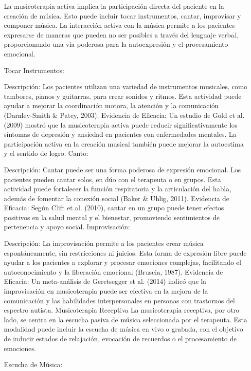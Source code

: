 La musicoterapia activa implica la participación directa del paciente en la creación de música. Esto puede incluir tocar instrumentos, cantar, improvisar y componer música. La interacción activa con la música permite a los pacientes expresarse de maneras que pueden no ser posibles a través del lenguaje verbal, proporcionando una vía poderosa para la autoexpresión y el procesamiento emocional.

Tocar Instrumentos:

Descripción: Los pacientes utilizan una variedad de instrumentos musicales, como tambores, pianos y guitarras, para crear sonidos y ritmos. Esta actividad puede ayudar a mejorar la coordinación motora, la atención y la comunicación (Darnley-Smith \& Patey, 2003).
Evidencia de Eficacia: Un estudio de Gold et al. (2009) mostró que la musicoterapia activa puede reducir significativamente los síntomas de depresión y ansiedad en pacientes con enfermedades mentales. La participación activa en la creación musical también puede mejorar la autoestima y el sentido de logro.
Canto:

Descripción: Cantar puede ser una forma poderosa de expresión emocional. Los pacientes pueden cantar solos, en dúo con el terapeuta o en grupos. Esta actividad puede fortalecer la función respiratoria y la articulación del habla, además de fomentar la conexión social (Baker \& Uhlig, 2011).
Evidencia de Eficacia: Según Clift et al. (2010), cantar en un grupo puede tener efectos positivos en la salud mental y el bienestar, promoviendo sentimientos de pertenencia y apoyo social.
Improvisación:

Descripción: La improvisación permite a los pacientes crear música espontáneamente, sin restricciones ni juicios. Esta forma de expresión libre puede ayudar a los pacientes a explorar y procesar emociones complejas, facilitando el autoconocimiento y la liberación emocional (Bruscia, 1987).
Evidencia de Eficacia: Un meta-análisis de Geretsegger et al. (2014) indicó que la improvisación en musicoterapia puede ser efectiva en la mejora de la comunicación y las habilidades interpersonales en personas con trastornos del espectro autista.
Musicoterapia Receptiva
La musicoterapia receptiva, por otro lado, se centra en la escucha pasiva de música seleccionada por el terapeuta. Esta modalidad puede incluir la escucha de música en vivo o grabada, con el objetivo de inducir estados de relajación, evocación de recuerdos o el procesamiento de emociones.

Escucha de Música:

